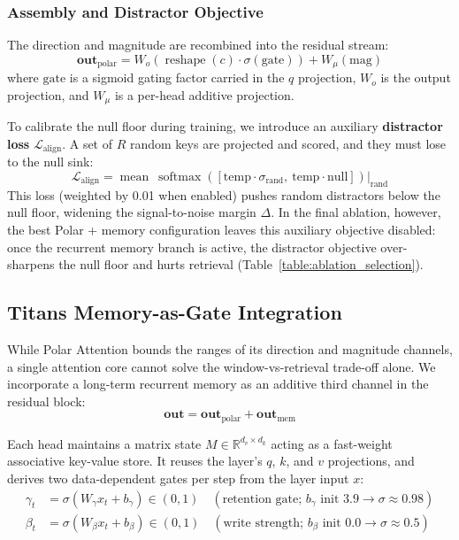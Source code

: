 \documentclass{article} %
\begin{document}
\subsubsection{Assembly and Distractor Objective}
The direction and magnitude are recombined into the residual stream:
\begin{equation}
    \mathbf{out}_{\text{polar}} = W_o\left( \operatorname{reshape}(c) \cdot \sigma(\text{gate}) \right) + W_{\mu}(\mathrm{mag})
\end{equation}
where $\text{gate}$ is a sigmoid gating factor carried in the $q$ projection, $W_o$ is the output projection, and $W_{\mu}$ is a per-head additive projection.

To calibrate the null floor during training, we introduce an auxiliary \textbf{distractor loss} $\mathcal{L}_{\text{align}}$. A set of $R$ random keys are projected and scored, and they must lose to the null sink:
\begin{equation}
    \mathcal{L}_{\text{align}} = \operatorname{mean}\ \operatorname{softmax}\left( [ \mathrm{temp} \cdot \sigma_{\text{rand}}, \ \mathrm{temp} \cdot \mathrm{null} ] \right)\Big|_{\text{rand}}
\end{equation}
This loss (weighted by 0.01 when enabled) pushes random distractors below the null floor, widening the signal-to-noise margin $\Delta$. In the final ablation, however, the best Polar + memory configuration leaves this auxiliary objective disabled: once the recurrent memory branch is active, the distractor objective over-sharpens the null floor and hurts retrieval (Table~\ref{table:ablation_selection}).

\subsection{Titans Memory-as-Gate Integration}
While Polar Attention bounds the ranges of its direction and magnitude channels, a single attention core cannot solve the window-vs-retrieval trade-off alone. We incorporate a long-term recurrent memory as an additive third channel in the residual block:
\begin{equation}
    \mathbf{out} = \mathbf{out}_{\text{polar}} + \mathbf{out}_{\text{mem}}
\end{equation}

Each head maintains a matrix state $M \in \mathbb{R}^{d_v \times d_k}$ acting as a fast-weight associative key-value store. It reuses the layer's $q$, $k$, and $v$ projections, and derives two data-dependent gates per step from the layer input $x$:
\begin{align}
    \gamma_t &= \sigma(W_{\gamma} x_t + b_{\gamma}) \in (0, 1) \quad (\text{retention gate; } b_{\gamma} \text{ init } 3.9 \to \sigma \approx 0.98) \\
    \beta_t &= \sigma(W_{\beta} x_t + b_{\beta}) \in (0, 1) \quad (\text{write strength; } b_{\beta} \text{ init } 0.0 \to \sigma \approx 0.5)
\end{align}
\end{document}

